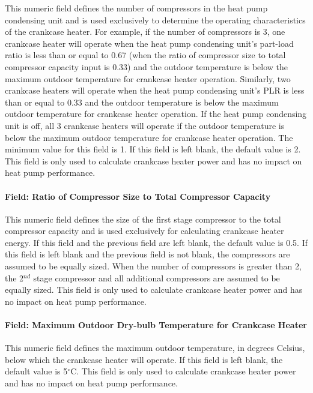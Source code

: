 This numeric field defines the number of compressors in the heat pump condensing unit and is used exclusively to determine the operating characteristics of the crankcase heater. For example, if the number of compressors is 3, one crankcase heater will operate when the heat pump condensing unit's part-load ratio is less than or equal to 0.67 (when the ratio of compressor size to total compressor capacity input is 0.33) and the outdoor temperature is below the maximum outdoor temperature for crankcase heater operation. Similarly, two crankcase heaters will operate when the heat pump condensing unit's PLR is less than or equal to 0.33 and the outdoor temperature is below the maximum outdoor temperature for crankcase heater operation. If the heat pump condensing unit is off, all 3 crankcase heaters will operate if the outdoor temperature is below the maximum outdoor temperature for crankcase heater operation. The minimum value for this field is 1. If this field is left blank, the default value is 2. This field is only used to calculate crankcase heater power and has no impact on heat pump performance.

\paragraph{Field: Ratio of Compressor Size to Total Compressor Capacity}\label{field-ratio-of-compressor-size-to-total-compressor-capacity-1}

This numeric field defines the size of the first stage compressor to the total compressor capacity and is used exclusively for calculating crankcase heater energy. If this field and the previous field are left blank, the default value is 0.5. If this field is left blank and the previous field is not blank, the compressors are assumed to be equally sized. When the number of compressors is greater than 2, the 2\(^{nd}\) stage compressor and all additional compressors are assumed to be equally sized. This field is only used to calculate crankcase heater power and has no impact on heat pump performance.

\paragraph{Field: Maximum Outdoor Dry-bulb Temperature for Crankcase Heater}\label{field-maximum-outdoor-dry-bulb-temperature-for-crankcase-heater-1}

This numeric field defines the maximum outdoor temperature, in degrees Celsius, below which the crankcase heater will operate. If this field is left blank, the default value is 5$^\circ$C. This field is only used to calculate crankcase heater power and has no impact on heat pump performance.

